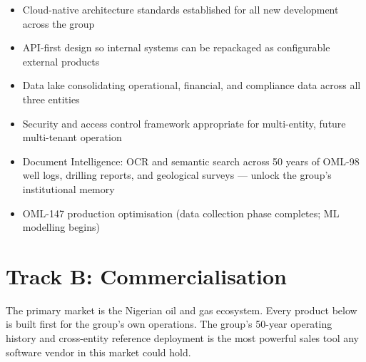 \documentclass[10pt]{article}
\begin{document}
\small
\begin{itemize}[leftmargin=1.5em, itemsep=2pt]
  \item Cloud-native architecture standards established for all new development across the group
  \item API-first design so internal systems can be repackaged as configurable external products
  \item Data lake consolidating operational, financial, and compliance data across all three entities
  \item Security and access control framework appropriate for multi-entity, future multi-tenant operation
  \item Document Intelligence: OCR and semantic search across 50 years of OML-98 well logs,
        drilling reports, and geological surveys --- unlock the group's institutional memory
  \item OML-147 production optimisation (data collection phase completes; ML modelling begins)
\end{itemize}
\normalsize

\vspace{10pt}

\section{Track B: Commercialisation}

{\small
The primary market is the Nigerian oil and gas ecosystem. Every product below is
built first for the group's own operations. The group's 50-year operating history
and cross-entity reference deployment is the most powerful sales tool any software
vendor in this market could hold.
}
\end{document}
